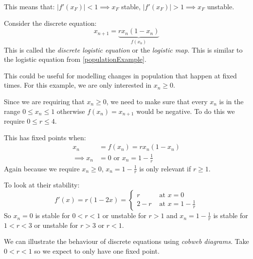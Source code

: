 \documentclass[../main.tex]{subfiles}
\begin{document}
This means that: $|f'(x_F)| < 1 \implies x_F$ stable, $|f'(x_F)| > 1 \implies x_F$ unstable.
\begin{example}
  Consider the discrete equation:
  \[
    x_{n+1} = \underbrace{rx_n (1 - x_n)}_{f(x_{n})}
  \]
  This is called the \textit{discrete logistic equation} or the \textit{logistic map}.
  This is similar to the logistic equation from \cref{populationExample}.

  This could be useful for modelling changes in population that happen at fixed times.
  For this example, we are only interested in $x_n \geq 0$.

  \begin{center}
  \end{center}
  Since we are requiring that $x_n \geq 0$, we need to make sure that every $x_n$ is in the range $0 \leq x_{n} \leq 1$ otherwise $f(x_n) = x_{n+1}$ would be negative.
  To do this we require $0 \leq r \leq 4$.

  This has fixed points when:
  \begin{align*}
    x_n &= f(x_n) = rx_n(1- x_n) \\
    \implies x_n &= 0 \text{ or } x_n = 1 - \frac{1}{r}
  \end{align*}
  Again because we require $x_n \geq 0$, $x_n = 1-\frac{1}{r}$ is only relevant if $r \geq 1$.

  To look at their stability:
  \[
    f'(x) = r(1-2x) = \begin{cases}
    r & \text{ at } x = 0 \\
    2 - r & \text{ at } x = 1 - \frac{1}{r}
    \end{cases}
  \]
  So $x_n = 0$ is stable for $0 < r < 1$ or unstable for $r > 1$ and $x_n = 1 - \frac{1}{r}$ is stable for $1 < r < 3$ or unstable for $r > 3$ or $r < 1$.

  We can illustrate the behaviour of discrete equations using \textit{cobweb diagrams}.
  Take $0 < r < 1$ so we expect to only have one fixed point.


\end{example}
\end{document}
